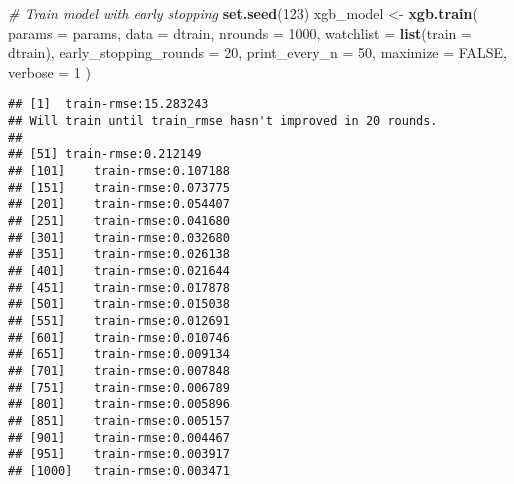 \documentclass[
]{article}
\newenvironment{Shaded}{\begin{snugshade}}{\end{snugshade}}
\newcommand{\AttributeTok}[1]{\textcolor[rgb]{0.13,0.29,0.53}{#1}}
\newcommand{\CommentTok}[1]{\textcolor[rgb]{0.56,0.35,0.01}{\textit{#1}}}
\newcommand{\ConstantTok}[1]{\textcolor[rgb]{0.56,0.35,0.01}{#1}}
\newcommand{\DecValTok}[1]{\textcolor[rgb]{0.00,0.00,0.81}{#1}}
\newcommand{\FunctionTok}[1]{\textcolor[rgb]{0.13,0.29,0.53}{\textbf{#1}}}
\newcommand{\NormalTok}[1]{#1}
\newcommand{\OtherTok}[1]{\textcolor[rgb]{0.56,0.35,0.01}{#1}}
\begin{document}
\begin{Shaded}
\begin{Highlighting}[]
\CommentTok{\#  Train model with early stopping}
\FunctionTok{set.seed}\NormalTok{(}\DecValTok{123}\NormalTok{)}
\NormalTok{xgb\_model }\OtherTok{\textless{}{-}} \FunctionTok{xgb.train}\NormalTok{(}
  \AttributeTok{params =}\NormalTok{ params,}
  \AttributeTok{data =}\NormalTok{ dtrain,}
  \AttributeTok{nrounds =} \DecValTok{1000}\NormalTok{,}
  \AttributeTok{watchlist =} \FunctionTok{list}\NormalTok{(}\AttributeTok{train =}\NormalTok{ dtrain),}
  \AttributeTok{early\_stopping\_rounds =} \DecValTok{20}\NormalTok{,}
  \AttributeTok{print\_every\_n =} \DecValTok{50}\NormalTok{,}
  \AttributeTok{maximize =} \ConstantTok{FALSE}\NormalTok{,}
  \AttributeTok{verbose =} \DecValTok{1}
\NormalTok{)}
\end{Highlighting}
\end{Shaded}

\begin{verbatim}
## [1]  train-rmse:15.283243 
## Will train until train_rmse hasn't improved in 20 rounds.
## 
## [51] train-rmse:0.212149 
## [101]    train-rmse:0.107188 
## [151]    train-rmse:0.073775 
## [201]    train-rmse:0.054407 
## [251]    train-rmse:0.041680 
## [301]    train-rmse:0.032680 
## [351]    train-rmse:0.026138 
## [401]    train-rmse:0.021644 
## [451]    train-rmse:0.017878 
## [501]    train-rmse:0.015038 
## [551]    train-rmse:0.012691 
## [601]    train-rmse:0.010746 
## [651]    train-rmse:0.009134 
## [701]    train-rmse:0.007848 
## [751]    train-rmse:0.006789 
## [801]    train-rmse:0.005896 
## [851]    train-rmse:0.005157 
## [901]    train-rmse:0.004467 
## [951]    train-rmse:0.003917 
## [1000]   train-rmse:0.003471
\end{verbatim}
\end{document}
